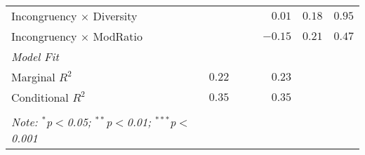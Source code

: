 \begin{table*}[]
\begin{tabular}{lrrlrrl}
    Incongruency $\times$ Diversity & & & & $0.01$ & $0.18$ & $0.95$\\
    Incongruency $\times$ ModRatio & & & & $-0.15$ & $0.21$ & $0.47$\\
    [1.2ex]
    \midrule
    \textit{Model Fit} & & \\ 
    Marginal $R^2$ & $0.22$ & & & $0.23$ & \\
    Conditional $R^2$ & $0.35$ & & & $0.35$ & \\
    \hline \\[-1.8ex] 
    \textit{Note: $^{*}$p$<$0.05; $^{**}$p$<$0.01; $^{***}$p$<$0.001} \\ 
    \bottomrule
    \end{tabular}
    \label{tab:modratio}
\end{table*}